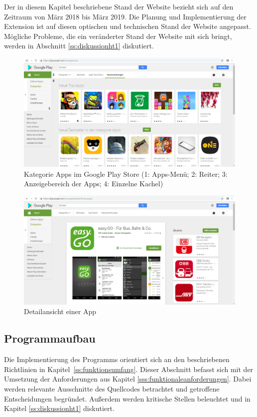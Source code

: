 Der in diesem Kapitel beschriebene Stand der Website bezieht sich auf den Zeitraum von März 2018 bis März 2019. Die Planung und Implementierung der Extension ist auf diesen optischen und technischen Stand der Website angepasst. Mögliche Probleme, die ein veränderter Stand der Website mit sich bringt, werden in Abschnitt \ref{ss:diskussionht1} diskutiert.

\begin{figure}[H]
	\centering
	\includegraphics[width=1\textwidth]{pics/playstore1num.png}
	\caption{Kategorie Apps im Google Play Store (1: Apps-Menü; 2: Reiter; 3: Anzeigebereich der Apps; 4: Einzelne Kachel)}
	\label{playstore1}
\end{figure}

\begin{figure}[H]
	\centering
	\includegraphics[width=1\textwidth]{pics/playstore2.png}
	\caption{Detailansicht einer App}
	\label{playstore2}
\end{figure}

\subsection{Programmaufbau}
\label{ss:programmaufbau}
Die Implementierung des Programms orientiert sich an den beschriebenen Richtlinien in Kapitel~\ref{ss:funktionsumfang}. Dieser Abschnitt befasst sich mit der Umsetzung der Anforderungen aus Kapitel \ref{sss:funktionaleanforderungen}. Dabei werden relevante Ausschnitte des Quellcodes betrachtet und getroffene Entscheidungen begründet. Außerdem werden kritische Stellen beleuchtet und in Kapitel \ref{ss:diskussionht1} diskutiert.

